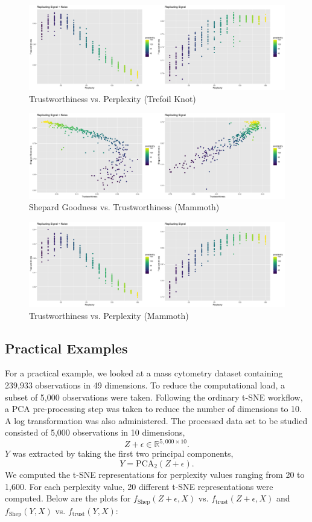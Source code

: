 \documentclass{article}
\begin{document}
\begin{figure}[H]
\includegraphics[scale=0.25]{trust plot (trefoil)}
\centering
\caption{Trustworthiness vs. Perplexity (Trefoil Knot)}
\end{figure}

\begin{figure}[H]
\includegraphics[scale=0.25]{mammoth plot}
\centering
\caption{Shepard Goodness vs. Trustworthiness (Mammoth)}
\end{figure}

\begin{figure}[H]
\includegraphics[scale=0.25]{trust plot (mammoth)}
\centering
\caption{Trustworthiness vs. Perplexity (Mammoth)}
\end{figure}

\subsection{Practical Examples}
For a practical example, we looked at a mass cytometry dataset containing 239,933 observations in 49 dimensions. To reduce the computational load, a subset of 5,000 observations were taken. Following the ordinary t-SNE workflow, a PCA pre-processing step was taken to reduce the number of dimensions to 10. A log transformation was also administered. The processed data set to be studied consisted of 5,000 observations in 10 dimensions, $$Z + \epsilon \in \mathbb{R}^{5,000 \times 10}.$$  $Y$ was extracted by taking the first two principal components, $$Y = \textrm{PCA}_2(Z + \epsilon).$$ We computed the t-SNE representations for perplexity values ranging from 20 to 1,600. For each perplexity value, 20 different t-SNE representations were computed. Below are the plots for $f_\textrm{Shep}(Z + \epsilon, X)$ vs. $f_\textrm{trust}(Z + \epsilon, X)$ and $f_\textrm{Shep}(Y, X)$ vs. $f_\textrm{trust}(Y, X)$:
\end{document}

